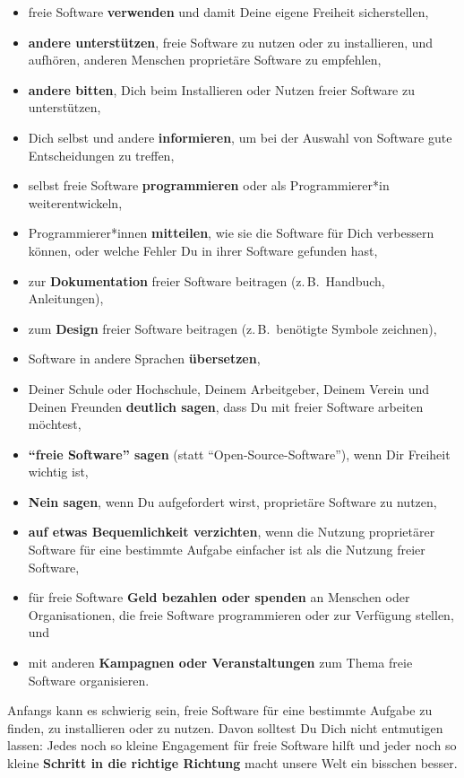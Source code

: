 \documentclass[a5paper,12pt]{scrartcl}
\begin{document}
\begin{itemize}
\item freie Software \textbf{verwenden} und damit Deine eigene
  Freiheit sicherstellen,
\item \textbf{andere unterstützen}, freie Software zu nutzen oder zu
  installieren, und aufhören, anderen Menschen proprietäre Software zu
  empfehlen,
\item \textbf{andere bitten}, Dich beim Installieren oder Nutzen
  freier Software zu unterstützen,
\item Dich selbst und andere \textbf{informieren}, um bei der Auswahl
  von Software gute Entscheidungen zu treffen,
\item selbst freie Software \textbf{programmieren} oder als
  Programmierer*in weiterentwickeln,
\item Programmierer*innen \textbf{mitteilen}, wie sie die Software für
  Dich verbessern können, oder welche Fehler Du in ihrer Software
  gefunden hast,
\item zur \textbf{Dokumentation} freier Software beitragen (z.\,B.\
  Handbuch, Anleitungen),
\item zum \textbf{Design} freier Software beitragen (z.\,B.\ benötigte
  Symbole zeichnen),
\item Software in andere Sprachen \textbf{übersetzen},
\item Deiner Schule oder Hochschule, Deinem Arbeitgeber, Deinem Verein
  und Deinen Freunden \textbf{deutlich sagen}, dass Du mit freier
  Software arbeiten möchtest,
\item \textbf{"`freie Software"' sagen} (statt
  "`Open-Source-Software"'), wenn Dir Freiheit wichtig ist,
\item \textbf{Nein sagen}, wenn Du aufgefordert wirst, proprietäre
  Software zu nutzen,
\item \textbf{auf etwas Bequemlichkeit verzichten}, wenn die Nutzung
  proprietärer Software für eine bestimmte Aufgabe einfacher ist als
  die Nutzung freier Software,
\item für freie Software \textbf{Geld bezahlen oder spenden} an
  Menschen oder Organisationen, die freie Software programmieren oder
  zur Verfügung stellen, und
\item mit anderen \textbf{Kampagnen oder Veranstaltungen} zum Thema
  freie Software organisieren.
\end{itemize}

Anfangs kann es schwierig sein, freie Software für eine bestimmte
Aufgabe zu finden, zu installieren oder zu nutzen. Davon solltest Du
Dich nicht entmutigen lassen: Jedes noch so kleine Engagement für
freie Software hilft und jeder noch so kleine \textbf{Schritt in die
  richtige Richtung} macht unsere Welt ein bisschen besser.
\end{document}
